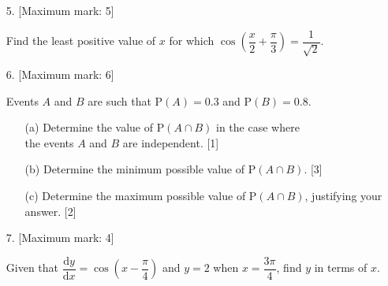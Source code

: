 \documentclass[12pt, twoside]{article}
\begin{document}
\begin{enumerate}[itemsep=0.15cm]

\newpage

\item[5.] [Maximum mark: 5]

Find the least positive value of $x$ for which
$\cos\!\left(\dfrac{x}{2} + \dfrac{\pi}{3}\right) = \dfrac{1}{\sqrt{2}}$.


\newpage

\item[6.] [Maximum mark: 6]

Events $A$ and $B$ are such that $\mathrm{P}(A) = 0.3$ and $\mathrm{P}(B) = 0.8$.

\begin{enumerate}[itemsep=0.1cm]
  \item[(a)] Determine the value of $\mathrm{P}(A \cap B)$ in the case where \\
  the events
  $A$ and $B$ are independent. \hfill [1]
  \item[(b)] Determine the minimum possible value of $\mathrm{P}(A \cap B)$. \hfill [3]
  \item[(c)] Determine the maximum possible value of $\mathrm{P}(A \cap B)$, justifying
  your answer. \hfill [2]
\end{enumerate}


\newpage

\item[7.] [Maximum mark: 4]

Given that $\dfrac{\mathrm{d}y}{\mathrm{d}x} = \cos\!\left(x - \dfrac{\pi}{4}\right)$
and $y = 2$ when $x = \dfrac{3\pi}{4}$, find $y$ in terms of $x$.



\end{enumerate}
\end{document}
